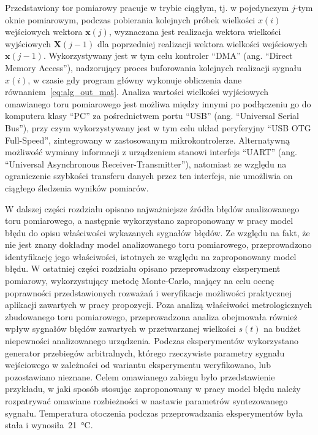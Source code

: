 Przedstawiony tor pomiarowy pracuje w trybie ciągłym, tj. w pojedynczym $j$-tym oknie pomiarowym, podczas pobierania kolejnych próbek wielkości $x(i)$ wejściowych wektora $\mathbf{x}(j)$, wyznaczana jest realizacja wektora wielkości wyjściowych $\mathbf{X}(j-1)$ dla poprzedniej realizacji wektora wielkości wejściowych $\mathbf{x}(j-1)$. Wykorzystywany jest w tym celu kontroler \enquote{DMA} (ang. \enquote{Direct Memory Access}), nadzorujący proces buforowania kolejnych realizacji sygnału $x(i)$, w czasie gdy program główny wykonuje obliczenia dane równaniem~\eqref{eq:alg_out_mat}. Analiza wartości wielkości wyjściowych omawianego toru pomiarowego jest możliwa między innymi po podłączeniu go do komputera klasy \enquote{PC} za pośrednictwem portu \enquote{USB} (ang. \enquote{Universal Serial Bus}), przy czym wykorzystywany jest w tym celu układ peryferyjny \enquote{USB OTG Full-Speed}, zintegrowany w zastosowanym mikrokontrolerze. Alternatywną możliwość wymiany informacji z urządzeniem stanowi interfejs \enquote{UART} (ang. \enquote{Universal Asynchronous Receiver-Transmitter}), natomiast ze względu na ograniczenie szybkości transferu danych przez ten interfejs, nie umożliwia on ciągłego śledzenia wyników pomiarów.

W dalszej części rozdziału opisano najważniejsze źródła błędów analizowanego toru pomiarowego, a następnie wykorzystano zaproponowany w pracy model błędu do opisu właściwości wykazanych sygnałów błędów. Ze względu na fakt, że nie jest znany dokładny model analizowanego toru pomiarowego, przeprowadzono identyfikację jego właściwości, istotnych ze względu na zaproponowany model błędu. W ostatniej części rozdziału opisano przeprowadzony eksperyment pomiarowy, wykorzystujący metodę Monte-Carlo, mający na celu ocenę poprawności przedstawionych rozważań i weryfikacje możliwości praktycznej aplikacji zawartych w pracy propozycji. Poza analizą właściwości metrologicznych zbudowanego toru pomiarowego, przeprowadzona analiza obejmowała również wpływ sygnałów błędów zawartych w przetwarzanej wielkości $s(t)$ na budżet niepewności analizowanego urządzenia. Podczas eksperymentów wykorzystano generator przebiegów arbitralnych, którego rzeczywiste parametry sygnału wejściowego w zależności od wariantu eksperymentu weryfikowano, lub pozostawiano nieznane. Celem omawianego zabiegu było przedstawienie przykładu, w jaki sposób stosując zaproponowany w pracy model błędu należy rozpatrywać omawiane rozbieżności w nastawie parametrów syntezowanego sygnału. Temperatura otoczenia podczas przeprowadzania eksperymentów była stała i wynosiła~\qty{21}{\degreeCelsius}.

